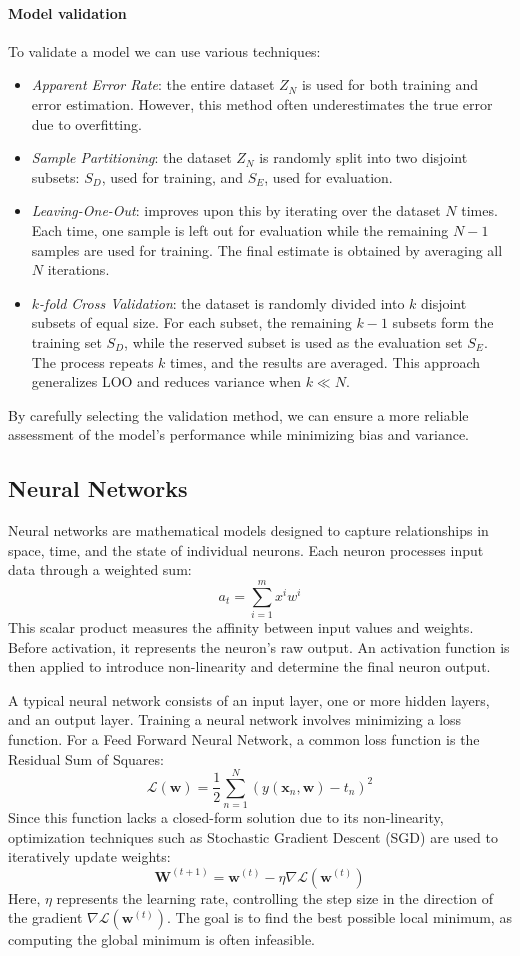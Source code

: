 \paragraph*{Model validation}
To validate a model we can use various techniques: 
\begin{itemize}
    \item \textit{Apparent Error Rate}: the entire dataset $Z_N$ is used for both training and error estimation. However, this method often underestimates the true error due to overfitting.  
    \item \textit{Sample Partitioning}: the dataset $Z_N$ is randomly split into two disjoint subsets: $S_D$, used for training, and $S_E$, used for evaluation.  
    \item \textit{Leaving-One-Out}: improves upon this by iterating over the dataset $N$ times. 
        Each time, one sample is left out for evaluation while the remaining $N-1$ samples are used for training. 
        The final estimate is obtained by averaging all $N$ iterations.  
    \item \textit{$k$-fold Cross Validation}: the dataset is randomly divided into $k$ disjoint subsets of equal size. 
        For each subset, the remaining $k-1$ subsets form the training set $S_D$, while the reserved subset is used as the evaluation set $S_E$. 
        The process repeats $k$ times, and the results are averaged. This approach generalizes LOO and reduces variance when $k \ll N$.  
\end{itemize}
\noindent By carefully selecting the validation method, we can ensure a more reliable assessment of the model’s performance while minimizing bias and variance.

\subsection{Neural Networks}
Neural networks are mathematical models designed to capture relationships in space, time, and the state of individual neurons. 
Each neuron processes input data through a weighted sum:
\[a_t=\sum_{i=1}^{m}x^iw^i\]
\noindent This scalar product measures the affinity between input values and weights. 
Before activation, it represents the neuron's raw output. An activation function is then applied to introduce non-linearity and determine the final neuron output.

A typical neural network consists of an input layer, one or more hidden layers, and an output layer.
Training a neural network involves minimizing a loss function. 
For a Feed Forward Neural Network, a common loss function is the Residual Sum of Squares:
\[\mathcal{L}(\mathbf{w})=\dfrac{1}{2}\sum_{n=1}^{N}\left(y(\mathbf{x}_n,\mathbf{w})-t_n\right)^2\]
Since this function lacks a closed-form solution due to its non-linearity, optimization techniques such as Stochastic Gradient Descent (SGD) are used to iteratively update weights:
\[\mathbf{W}^{(t+1)}=\mathbf{w}^{(t)}-\eta\nabla\mathcal{L}(\mathbf{w}^{(t)})\]
\noindent Here, $\eta$ represents the learning rate, controlling the step size in the direction of the gradient $\nabla\mathcal{L}(\mathbf{w}^{(t)})$. 
The goal is to find the best possible local minimum, as computing the global minimum is often infeasible.

